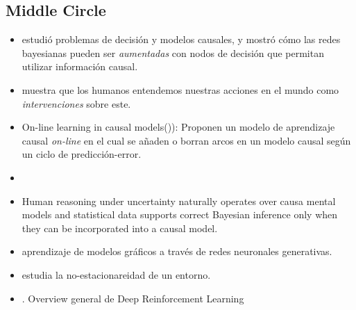 \documentclass[11pt]{article}
\theoremstyle{plain}
\begin{document}
\subsection{Middle Circle}
\begin{itemize}
\item \cite{dawid2002influence} estudió problemas de decisión y modelos causales, y mostró cómo las redes bayesianas pueden ser \textit{aumentadas} con nodos de decisión que permitan utilizar información causal.
\item \cite{hagmayer2009decision} muestra que los humanos entendemos nuestras acciones en el mundo como \textit{intervenciones} sobre este. 
\item On-line learning in causal models(\cite{wellen2012learning})):  Proponen un modelo de aprendizaje causal \textit{on-line} en el cual se añaden o borran arcos en un modelo causal según un ciclo de predicción-error.
\item \cite{lopez2015towards}
\item \cite{krynski2007role} Human reasoning under uncertainty naturally operates over causa mental models and statistical data supports correct Bayesian inference only when they can be incorporated into a causal model. 
\item \cite{goudet2017learning} aprendizaje de modelos gráficos a través de redes neuronales generativas.
\item \cite{hernandez2017survey} estudia la no-estacionareidad de un entorno.
\item \cite{li2017deep}. Overview general de Deep Reinforcement Learning

\end{itemize}
\end{document}
